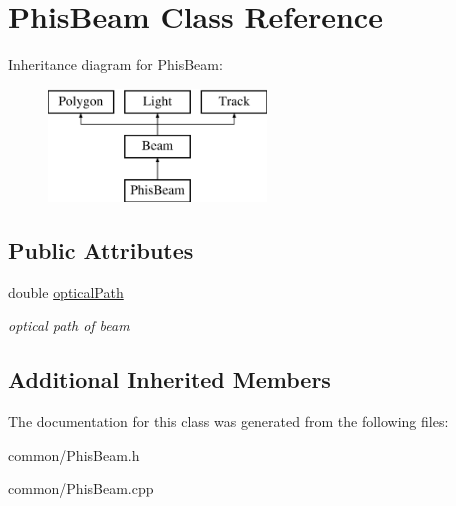 \hypertarget{class_phis_beam}{}\section{Phis\+Beam Class Reference}
\label{class_phis_beam}
Inheritance diagram for Phis\+Beam\+:\begin{figure}[H]
\begin{center}
\leavevmode
\includegraphics[height=3.000000cm]{class_phis_beam}
\end{center}
\end{figure}
\subsection*{Public Attributes}
\begin{DoxyCompactItemize}
\item 
\mbox{\label{class_phis_beam_a31d260d43669ed31679cb41f95ca2056}} 
double \mbox{\hyperlink{class_phis_beam_a31d260d43669ed31679cb41f95ca2056}{optical\+Path}}
\begin{DoxyCompactList}\small\item\em optical path of beam \end{DoxyCompactList}\end{DoxyCompactItemize}
\subsection*{Additional Inherited Members}


The documentation for this class was generated from the following files\+:\begin{DoxyCompactItemize}
\item 
common/Phis\+Beam.\+h\item 
common/Phis\+Beam.\+cpp\end{DoxyCompactItemize}
